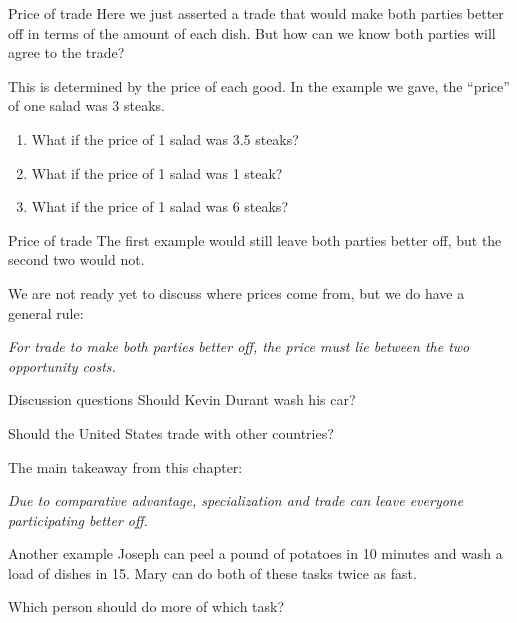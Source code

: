 \documentclass[aspectratio=169]{beamer}
\begin{document}
\begin{frame}{Price of trade}
    Here we just asserted a trade that would make both parties better off in terms of the amount of each dish. But how can we know both parties will agree to the trade?
    
    \medskip

    This is determined by the price of each good. In the example we gave, the ``price'' of one salad was 3 steaks.

    \begin{enumerate}
        \item What if the price of 1 salad was 3.5 steaks?
        \item What if the price of 1 salad was 1 steak?
        \item What if the price of 1 salad was 6 steaks?
    \end{enumerate}
\end{frame}

\begin{frame}{Price of trade}
    The first example would still leave both parties better off, but the second two would not.

    \medskip

    We are not ready yet to discuss where prices come from, but we do have a general rule:

    \begin{center}
        \textit{For trade to make both parties better off, the price must lie between the two opportunity costs.}
    \end{center}

\end{frame}

\begin{frame}{Discussion questions}
    Should Kevin Durant wash his car?

    \medskip

    Should the United States trade with other countries?

    \medskip

    The main takeaway from this chapter:

    \begin{center}
        \textit{Due to comparative advantage, specialization and trade can leave everyone participating better off.}
    \end{center}
\end{frame} 

\begin{frame}{Another example}
    Joseph can peel a pound of potatoes in 10 minutes and wash a load of dishes in 15. Mary can do both of these tasks twice as fast. 

    \medskip

    Which person should do more of which task?
\end{frame}
\end{document}

